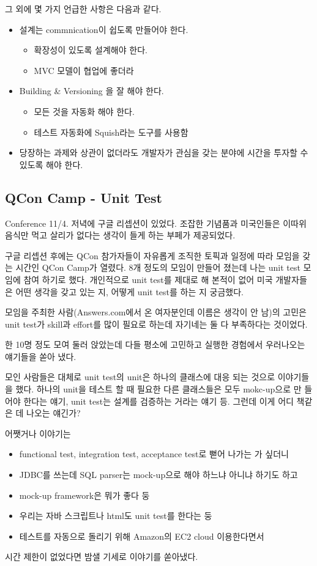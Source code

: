 \documentclass[11pt]{article}
\begin{document}
그 외에 몇 가지 언급한 사항은 다음과 같다.
\begin{itemize}
\item 설계는 commnication이 쉽도록 만들어야 한다.
    \begin{itemize}
    \item 확장성이 있도록 설계해야 한다.
    \item MVC 모델이 협업에 좋더라
    \end{itemize}
\item Building \& Versioning 을 잘 해야 한다.
    \begin{itemize}
    \item 모든 것을 자동화 해야 한다.
    \item 테스트 자동화에 Squish라는 도구를 사용함
    \end{itemize}
\item 당장하는 과제와 상관이 없더라도 개발자가 관심을 갖는 분야에 시간을 투자할 수 있도록 해야 한다.
\end{itemize}
 
\subsection{QCon Camp - Unit Test}

Conference 11/4. 저녁에 구글 리셉션이 있었다. 조잡한 기념품과 미국인들은
이따위 음식만 먹고 살리가 없다는 생각이 들게 하는 부페가 제공되었다.
 
구글 리셉션 후에는 QCon 참가자들이 자유롭게 조직한 토픽과 일정에 따라
모임을 갖는 시간인 QCon Camp가 열렸다. 8개 정도의 모임이 만들어 졌는데
나는 unit test 모임에 참여 하기로 했다.
개인적으로 unit test를 제대로 해 본적이 없어 미국 개발자들은 어떤
생각을 갖고 있는 지, 어떻게 unit test를 하는 지 궁금했다.

모임을 주최한 사람(Answers.com에서 온 여자분인데 이름은 생각이 안 남)의 
고민은 unit test가 skill과 effort를 많이 필요로 하는데 자기네는 둘 다 
부족하다는 것이었다.

한 10명 정도 모여 둘러 앉았는데 다들 평소에 고민하고 실행한 경험에서
우러나오는 얘기들을 쏟아 냈다.
 
모인 사람들은 대체로 unit test의 unit은 하나의
클래스에 대응 되는 것으로 이야기들을 했다. 하나의 unit을 테스트 할 때
필요한 다른 클래스들은 모두 mokc-up으로 만 들어야 한다는 얘기, unit
test는 설계를 검증하는 거라는 얘기 등. 
그런데 이게 어디 책같은 데 나오는 얘긴가?
 
어쨋거나 이야기는 
\begin{itemize}
\item functional test, integration test, acceptance test로 뻗어 나가는 
가 싶더니 
\item JDBC를 쓰는데 SQL parser는  mock-up으로 해야 하느냐 아니냐 하기도 하고 
\item mock-up framework은 뭐가 좋다 둥 
\item 우리는 자바 스크립트나 html도 unit test를 한다는 둥
\item 테스트를 자동으로 돌리기 위해 Amazon의 EC2 cloud 이용한다면서 
\end{itemize}
시간 제한이 없었다면 밤샐 기세로 이야기를 쏟아냈다. 
\end{document}

